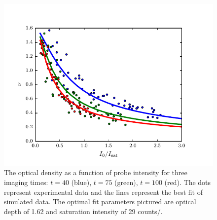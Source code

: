 \documentclass[12pt]{iopart}
\begin{document}
\begin{figure}
	\includegraphics{figure8.pdf}
\caption{The optical density as a function of probe intensity for three imaging times: $t=40$\us{} (blue),  $t=75$\us{} (green),  $t=100$\us{} (red). The dots represent experimental data and the lines represent the best fit of simulated data. The optimal fit parameters pictured are optical depth of 1.62 and saturation intensity of 29 counts/\us{}. }  
\label{fig:isatCalib}
\end{figure}
\end{document}
